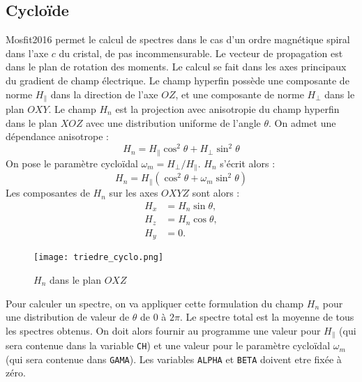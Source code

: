 \subsection{Cyclo\"ide}
Mosfit2016 permet le calcul de spectres dans le cas d'un ordre magnétique spiral dans l'axe $c$ du cristal, de pas incommensurable. 
Le vecteur de propagation est dans le plan de rotation des moments.
Le calcul se fait dans les axes principaux du gradient de champ électrique.
Le champ hyperfin possède une composante de norme $H_\parallel$ dans la direction de l'axe $OZ$, et une composante de norme $H_\perp$ dans le plan $OXY$.
Le champ $H_n$ est la projection avec anisotropie du champ hyperfin dans le plan $XOZ$ avec une distribution uniforme de l'angle $\theta$.
On admet une dépendance anisotrope :
\begin{equation}
  H_n = H_{\parallel}\cos^2  \theta + H_{\perp}\sin^2\theta
\end{equation}
On pose le paramètre cyclo\"idal $\omega_m = H_{\perp}/ H_{\parallel}$.
$H_n$ s'écrit alors :
\begin{equation}
  H_n = H_{\parallel}( \cos^2\theta + \omega_m \sin^2 \theta)
\end{equation}
Les composantes de $H_n$ sur les axes $OXYZ$ sont alors :
\begin{align*}
  H_x &= H_n \sin \theta,\\
  H_z &= H_n \cos \theta,\\
  H_y &= 0.
\end{align*}

\begin{figure}[!h]
\centering
\texttt{[image: triedre\_cyclo.png]}
\caption{\label{fig:cycloide}$H_n$ dans le plan $OXZ$}
\end{figure}

Pour calculer un spectre, on va appliquer cette formulation du champ $H_n$ pour une distribution de valeur de $\theta$ de $0$ à $2\pi$. 
Le spectre total est la moyenne de tous les spectres obtenus.
On doit alors fournir au programme une valeur pour $H_{\parallel}$ (qui sera contenue dans la variable \lstinline{CH}) et une valeur pour le paramètre cyclo\"idal $\omega_m$ (qui sera contenue dans \lstinline{GAMA}).
Les variables \lstinline{ALPHA} et \lstinline{BETA} doivent etre fixée à zéro.

